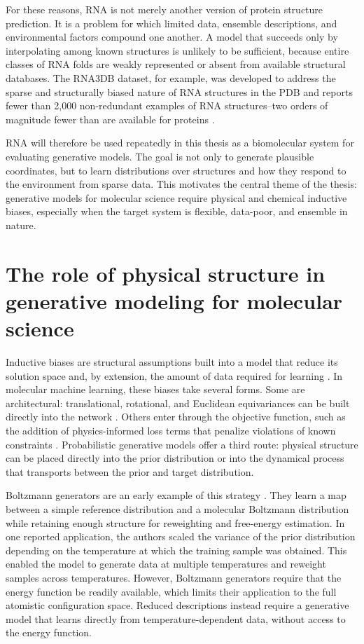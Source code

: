 For these reasons, RNA is not merely another version of protein structure prediction. It is a problem for which limited data, ensemble descriptions, and environmental factors compound one another. A model that succeeds only by interpolating among known structures is unlikely to be sufficient, because entire classes of RNA folds are weakly represented or absent from available structural databases. The RNA3DB dataset, for example, was developed to address the sparse and structurally biased nature of RNA structures in the PDB and reports fewer than 2,000 non-redundant examples of RNA structures--two orders of magnitude fewer than are available for proteins \citep{Szikszai2024RNA3DB}.

RNA will therefore be used repeatedly in this thesis as a biomolecular system for evaluating generative models. The goal is not only to generate plausible coordinates, but to learn distributions over structures and how they respond to the environment from sparse data. This motivates the central theme of the thesis: generative models for molecular science require physical and chemical inductive biases, especially when the target system is flexible, data-poor, and ensemble in nature.

\section{The role of physical structure in generative modeling for molecular science}
\label{ch1:sec:physical-structure}

Inductive biases are structural assumptions built into a model that reduce its solution space and, by extension, the amount of data required for learning \citep{Battaglia2018Relational}. In molecular machine learning, these biases take several forms. Some are architectural: translational, rotational, and Euclidean equivariances can be built directly into the network \citep{Fuchs2020SE3}. Others enter through the objective function, such as the addition of physics-informed loss terms that penalize violations of known constraints \citep{Cuomo2022PINNs}. Probabilistic generative models offer a third route: physical structure can be placed directly into the prior distribution or into the dynamical process that transports between the prior and target distribution.

Boltzmann generators are an early example of this strategy \citep{Noe2019Boltzmann}. They learn a map between a simple reference distribution and a molecular Boltzmann distribution while retaining enough structure for reweighting and free-energy estimation. In one reported application, the authors scaled the variance of the prior distribution depending on the temperature at which the training sample was obtained. This enabled the model to generate data at multiple temperatures and reweight samples across temperatures. However, Boltzmann generators require that the energy function be readily available, which limits their application to the full atomistic configuration space. Reduced descriptions instead require a generative model that learns directly from temperature-dependent data, without access to the energy function.

